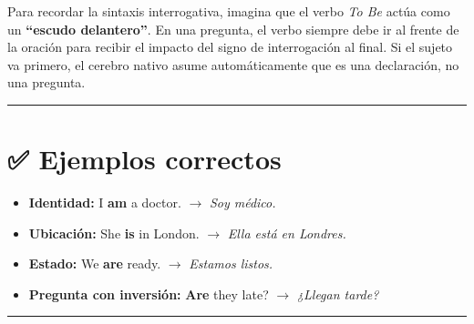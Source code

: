 \documentclass[
  spanish,
  letterpaper,
]{scrbook}
\providecommand{\tightlist}{%
  \setlength{\itemsep}{0pt}\setlength{\parskip}{0pt}}
\begin{document}
\begin{tcolorbox}[enhanced jigsaw, opacityback=0, toptitle=1mm, toprule=.15mm, leftrule=.75mm, colframe=quarto-callout-tip-color-frame, coltitle=black, opacitybacktitle=0.6, rightrule=.15mm, titlerule=0mm, bottomtitle=1mm, arc=.35mm, left=2mm, colback=white, breakable, bottomrule=.15mm, title={💡 Truco mnemotécnico}, colbacktitle=quarto-callout-tip-color!10!white]

Para recordar la sintaxis interrogativa, imagina que el verbo \emph{To
Be} actúa como un \textbf{``escudo delantero''}. En una pregunta, el
verbo siempre debe ir al frente de la oración para recibir el impacto
del signo de interrogación al final. Si el sujeto va primero, el cerebro
nativo asume automáticamente que es una declaración, no una pregunta.

\end{tcolorbox}

\begin{center}\rule{0.5\linewidth}{0.5pt}\end{center}

\section{✅ Ejemplos correctos}\label{ejemplos-correctos}

\begin{itemize}
\tightlist
\item
  \textbf{Identidad:} I \textbf{am} a doctor. \(\rightarrow\) \emph{Soy
  médico.}
\item
  \textbf{Ubicación:} She \textbf{is} in London. \(\rightarrow\)
  \emph{Ella está en Londres.}
\item
  \textbf{Estado:} We \textbf{are} ready. \(\rightarrow\) \emph{Estamos
  listos.}
\item
  \textbf{Pregunta con inversión:} \textbf{Are} they late?
  \(\rightarrow\) \emph{¿Llegan tarde?}
\end{itemize}

\begin{center}\rule{0.5\linewidth}{0.5pt}\end{center}
\end{document}
